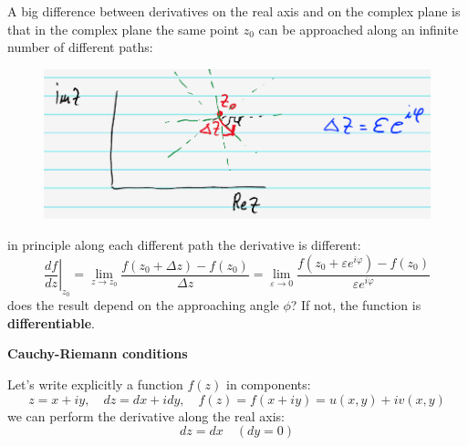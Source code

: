 \documentclass{article}
\begin{document}
\noindent
A big difference between derivatives on the real axis and on the complex plane is that in the complex plane the same point $z_0$ can be approached along an infinite number of different paths:
\begin{figure}[h]
    \centering
    \includegraphics[width=0.6\linewidth]{fig8.png}
\end{figure}
in principle along each different path the derivative is different:
\begin{equation}
\left.     \frac{df}{dz} \right|_{z_0}
= \lim_{z \to z_0} \frac{f(z_0 + \Delta z) - f(z_0)}{\Delta z}
= \lim_{\varepsilon \to 0} \frac{f(z_0 + \varepsilon e^{i\varphi}) - f(z_0)}{\varepsilon e^{i\varphi}}
\end{equation}
does the result depend on the approaching angle $\phi$? If not, the function is \textbf{differentiable}.

\vspace{2mm} \noindent
\textbf{Cauchy-Riemann conditions}

\noindent
Let’s write explicitly a function $f(z)$ in components:
\begin{equation}
    z=x+iy, \quad dz = dx + idy, \quad f(z) = f(x+iy) = u(x,y)+iv(x,y)
\end{equation}
we can perform the derivative along the real axis:
\begin{equation}
    dz=dx \quad (dy=0)
\end{equation}
\end{document}
